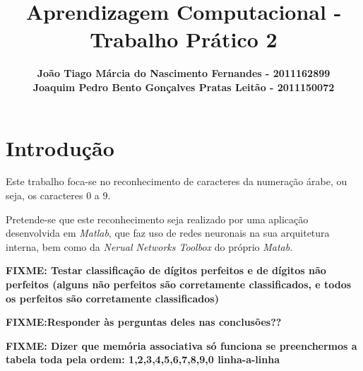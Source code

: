 \documentclass{article}
\title{\bf{Aprendizagem Computacional - Trabalho Prático 2}\vspace{80mm}}
\author{\textbf{João Tiago Márcia do Nascimento Fernandes - 2011162899} \\
\textbf{Joaquim Pedro Bento Gonçalves Pratas Leitão - 2011150072}}
\begin{document}
\maketitle

\pagebreak

\renewcommand*\contentsname{Índice}
\tableofcontents

\pagebreak

\section{Introdução}

Este trabalho foca-se no reconhecimento de caracteres da numeração árabe, ou seja, os caracteres 0 a 9.

Pretende-se que este reconhecimento seja realizado por uma aplicação desenvolvida em \emph{Matlab}, que faz uso de redes neuronais na sua arquitetura interna, bem como da \emph{Nerual Networks Toolbox} do próprio \emph{Matab}.

\pagebreak

\textbf{FIXME: Testar classificação de dígitos perfeitos e de dígitos não perfeitos (alguns não perfeitos são corretamente classificados, e todos os perfeitos são corretamente classificados)}

\textbf{FIXME:Responder às perguntas deles nas conclusões??}

\textbf{FIXME: Dizer que memória associativa só funciona se preenchermos a tabela toda pela ordem: 1,2,3,4,5,6,7,8,9,0 linha-a-linha}

\pagebreak
\section{}
\end{document}
